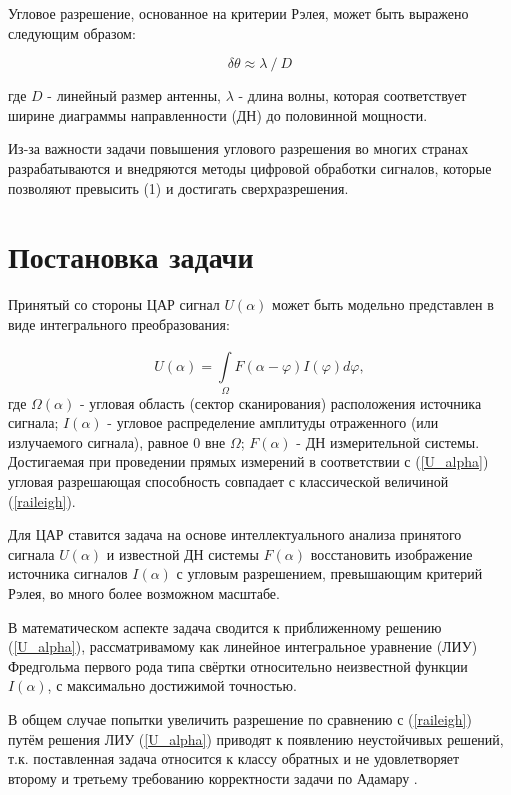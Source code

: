 \documentclass{article}
\begin{document}
	Угловое разрешение, основанное на критерии Рэлея, может быть выражено следующим образом:
	
	\begin{equation} \label{raileigh}
			\delta \theta \approx \lambda\ /\ D
	\end{equation}
	
	где $D$ - линейный размер антенны, $\lambda$ - длина волны, которая соответствует ширине диаграммы направленности (ДН) до половинной мощности.
	
	Из-за важности задачи повышения углового разрешения во многих странах разрабатываются и внедряются методы цифровой обработки сигналов, которые позволяют превысить (1) и достигать сверхразрешения. \cite{lit1, lit2, lit3, lit4, lit5, lit6}
	
	\section*{Постановка задачи}
	
	Принятый со стороны ЦАР сигнал $U(\alpha)$ может быть модельно представлен в виде интегрального преобразования:
	
	\begin{equation} \label{U_alpha}
		U(\alpha) = \int \limits_{\Omega}^{} F(\alpha - \varphi) I(\varphi) d\varphi,
	\end{equation}
	где $\Omega(\alpha)$ - угловая область (сектор сканирования) расположения источника сигнала; $I(\alpha)$ - угловое распределение амплитуды отраженного (или излучаемого сигнала), равное $0$ вне $\Omega$; $F(\alpha)$ - ДН измерительной системы. Достигаемая при проведении прямых измерений в соответствии с (\ref{U_alpha}) угловая разрешающая способность совпадает с классической величиной (\ref{raileigh}).
	
	Для ЦАР ставится задача на основе интеллектуального анализа принятого сигнала $U(\alpha)$ и известной ДН системы $F(\alpha)$ восстановить изображение источника сигналов $I(\alpha)$ с угловым разрешением, превышающим критерий Рэлея, во много более возможном масштабе.
	
	В математическом аспекте задача сводится к приближенному решению (\ref{U_alpha}), рассматривамому как линейное интегральное уравнение (ЛИУ) Фредгольма первого рода типа свёртки относительно неизвестной функции $I(\alpha)$, с максимально достижимой точностью.
	
	В общем случае попытки увеличить разрешение по сравнению с (\ref{raileigh}) путём решения ЛИУ (\ref{U_alpha}) приводят к появлению неустойчивых решений, т.к. поставленная задача относится к классу обратных и не удовлетворяет второму и третьему требованию корректности задачи по Адамару \cite{lit3, lit7, lit8, lit9, lit10}.
	
\end{document}
